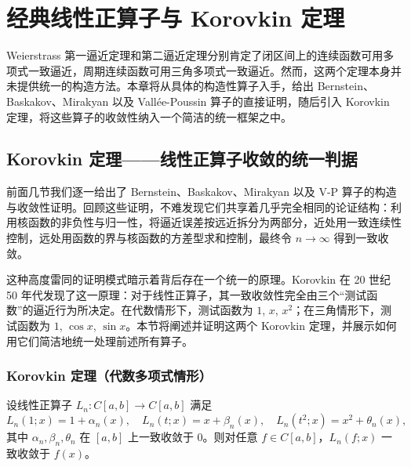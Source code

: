 \section{经典线性正算子与 Korovkin 定理}

Weierstrass 第一逼近定理和第二逼近定理分别肯定了闭区间上的连续函数可用多项式一致逼近，周期连续函数可用三角多项式一致逼近。然而，这两个定理本身并未提供统一的构造方法。本章将从具体的构造性算子入手，给出 Bernstein、Baskakov、Mirakyan 以及 Vallée-Poussin 算子的直接证明，随后引入 Korovkin 定理，将这些算子的收敛性纳入一个简洁的统一框架之中。




%

%

\subsection{Korovkin 定理——线性正算子收敛的统一判据}

前面几节我们逐一给出了 Bernstein、Baskakov、Mirakyan 以及 V-P 算子的构造与收敛性证明。回顾这些证明，不难发现它们共享着几乎完全相同的论证结构：利用核函数的非负性与归一性，将逼近误差按远近拆分为两部分，近处用一致连续性控制，远处用函数的界与核函数的方差型求和控制，最终令 $n\to\infty$ 得到一致收敛。

这种高度雷同的证明模式暗示着背后存在一个统一的原理。Korovkin 在 20 世纪 50 年代发现了这一原理：对于线性正算子，其一致收敛性完全由三个“测试函数”的逼近行为所决定。在代数情形下，测试函数为 $1$, $x$, $x^2$；在三角情形下，测试函数为 $1$, $\cos x$, $\sin x$。本节将阐述并证明这两个 Korovkin 定理，并展示如何用它们简洁地统一处理前述所有算子。

\subsubsection{Korovkin 定理（代数多项式情形）}

\begin{theorem}
设线性正算子 $L_n: C[a,b]\to C[a,b]$ 满足
\[
L_n(1;x)=1+\alpha_n(x),\quad L_n(t;x)=x+\beta_n(x),\quad L_n(t^2;x)=x^2+\theta_n(x),
\]
其中 $\alpha_n,\beta_n,\theta_n$ 在 $[a,b]$ 上一致收敛于 $0$。则对任意 $f\in C[a,b]$，$L_n(f;x)$ 一致收敛于 $f(x)$。
\end{theorem}

